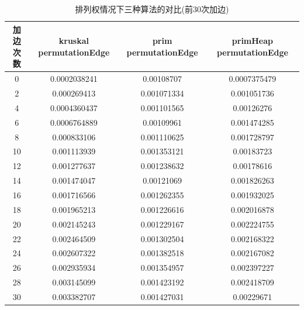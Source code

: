 \documentclass[UTF8]{ctexart}
\begin{document}
\begin{table}[htbp]
    \begin{tabular}{|c|c|c|c|}
    \hline
    加边次数 & kruskal permutationEdge & prim permutationEdge & primHeap permutationEdge \\ \hline
    0    & 0.0002038241            & 0.00108707           & 0.0007375479             \\ \hline
    2    & 0.000269413             & 0.001071334          & 0.001051736              \\ \hline
    4    & 0.0004360437            & 0.001101565          & 0.00126276               \\ \hline
    6    & 0.0006764889            & 0.00109961           & 0.001474285              \\ \hline
    8    & 0.000833106             & 0.001110625          & 0.001728797              \\ \hline
    10   & 0.001113939             & 0.001353121          & 0.00183723               \\ \hline
    12   & 0.001277637             & 0.001238632          & 0.00178616               \\ \hline
    14   & 0.001474047             & 0.00121069           & 0.001826263              \\ \hline
    16   & 0.001716566             & 0.001262355          & 0.001932025              \\ \hline
    18   & 0.001965213             & 0.001226616          & 0.002016878              \\ \hline
    20   & 0.002145243             & 0.001229167          & 0.002224755              \\ \hline
    22   & 0.002464509             & 0.001302504          & 0.002168322              \\ \hline
    24   & 0.002607322             & 0.001382518          & 0.002167082              \\ \hline
    26   & 0.002935934             & 0.001354957          & 0.002397227              \\ \hline
    28   & 0.003145099             & 0.001423192          & 0.002418709              \\ \hline
    30   & 0.003382707             & 0.001427031          & 0.00229671               \\ \hline
    \end{tabular}
    \caption{排列权情况下三种算法的对比(前30次加边)}
    \label{tab:primheapp}
\end{table}
\end{document}
